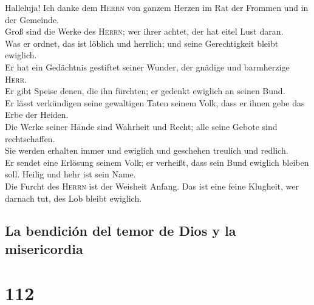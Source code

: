  Halleluja! Ich danke dem \textsc{Herrn} von ganzem Herzen
im Rat der Frommen und in der Gemeinde.\\
 Groß sind die Werke des \textsc{Herrn}; wer ihrer achtet,
der hat eitel Lust daran.\\
 Was er ordnet, das ist löblich und herrlich; und seine
Gerechtigkeit bleibt ewiglich.\\
 Er hat ein Gedächtnis gestiftet seiner Wunder, der
gnädige und barmherzige \textsc{Herr}.\\
 Er gibt Speise denen, die ihn fürchten; er gedenkt
ewiglich an seinen Bund.\\
 Er lässt verkündigen seine gewaltigen Taten seinem Volk,
dass er ihnen gebe das Erbe der Heiden.\\
 Die Werke seiner Hände sind Wahrheit und Recht; alle
seine Gebote sind rechtschaffen.\\
 Sie werden erhalten immer und ewiglich und geschehen
treulich und redlich.\\
 Er sendet eine Erlösung seinem Volk; er verheißt, dass
sein Bund ewiglich bleiben soll. Heilig und hehr ist sein Name.\\
 Die Furcht des \textsc{Herrn} ist der Weisheit Anfang.
Das ist eine feine Klugheit, wer darnach tut, des Lob bleibt ewiglich.

\hypertarget{la-bendiciuxf3n-del-temor-de-dios-y-la-misericordia}{%
\subsection{La bendición del temor de Dios y la
misericordia}\label{la-bendiciuxf3n-del-temor-de-dios-y-la-misericordia}}

\hypertarget{section-111}{%
\section{112}\label{section-111}}

